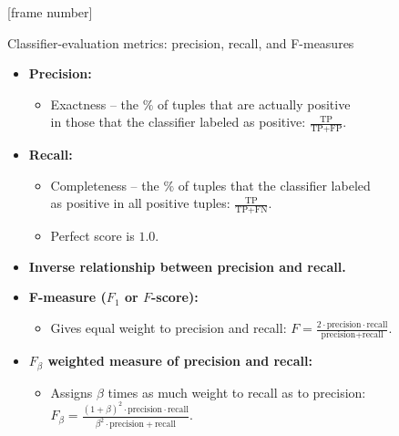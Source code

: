 \documentclass[aspectratio=169,t,table]{beamer}
\begin{document}
  {
    [frame number]
    \begin{frame}{Classifier-evaluation metrics: precision, recall, and F-measures}
      \begin{itemize}
        \item \textbf{Precision:}
        \begin{itemize}
          \item Exactness -- the $\%$ of tuples that are actually positive \\
          in those that the classifier labeled as positive: $\frac{\text{TP}}{\text{TP} + \text{FP}}$.
        \end{itemize}
        \item \textbf{Recall:}
        \begin{itemize}
          \item Completeness -- the $\%$ of tuples that the classifier labeled \\
          as positive in all positive tuples: $\frac{\text{TP}}{\text{TP} + \text{FN}}$.
          \item Perfect score is $1.0$.
        \end{itemize}
        \item \textbf{Inverse relationship between precision and recall.}
        \item \textbf{F-measure ($F_1$ or $F$-score):}
        \begin{itemize}
          \item Gives equal weight to precision and recall: $F = \frac{2\cdot\text{precision}\cdot \text{recall}}{\text{precision} + \text{recall}}$.
        \end{itemize}
        \item \textbf{$F_\beta$ weighted measure of precision and recall:}
        \begin{itemize}
          \item Assigns $\beta$ times as much weight to recall as to precision: $F_\beta = \frac{(1+\beta)^2 \cdot \text{precision} \cdot \text{recall}}{\beta^2 \cdot \text{precision} + \text{recall}}$.
        \end{itemize}
      \end{itemize}
    \end{frame}
  }
\end{document}
